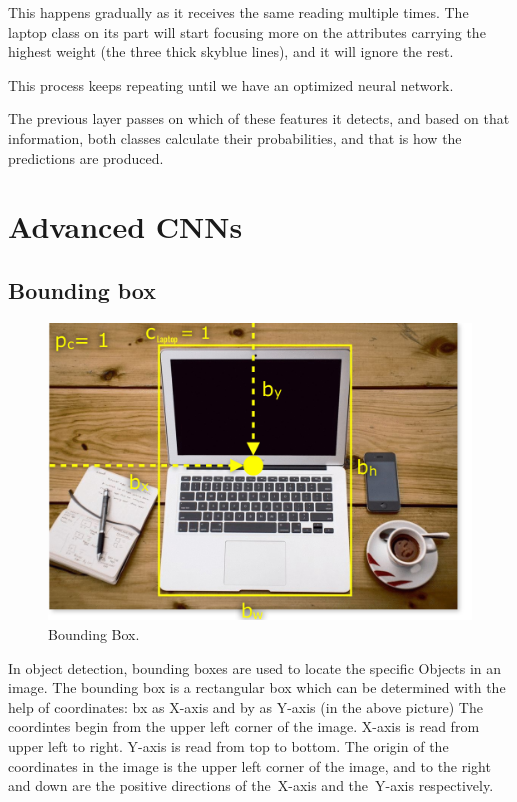 \documentclass[a4paper,13pt,twoside]{book}
\begin{document}
This happens gradually as it receives the same reading multiple times. The laptop class on its part will start focusing more on the attributes carrying the highest weight (the three thick skyblue lines), and it will ignore the rest.

This process keeps repeating until we have an optimized neural network.

The previous layer passes on which of these features it detects, and based on that information, both classes calculate their probabilities, and that is how the predictions are produced.

\chapter{Advanced CNNs}

\section{Bounding box}

\begin{figure}[h!]
  \includegraphics[width=\linewidth]{Images/boundingbox27.png}
  \caption{Bounding Box.}
  \label{fig:Bounding Box}
\end{figure}

In object detection, bounding boxes are used to locate the specific Objects in an image. The bounding box is a rectangular box which can be determined with the help of coordinates:
bx as X-axis and by as Y-axis (in the above picture)
The coordintes begin from the upper left corner of the image.
X-axis is read from upper left to right.
Y-axis is read from top to bottom.
The origin of the coordinates in the image is the upper left corner of the image, and to the right and down are the positive directions of the X-axis and the Y-axis respectively.
\end{document}
